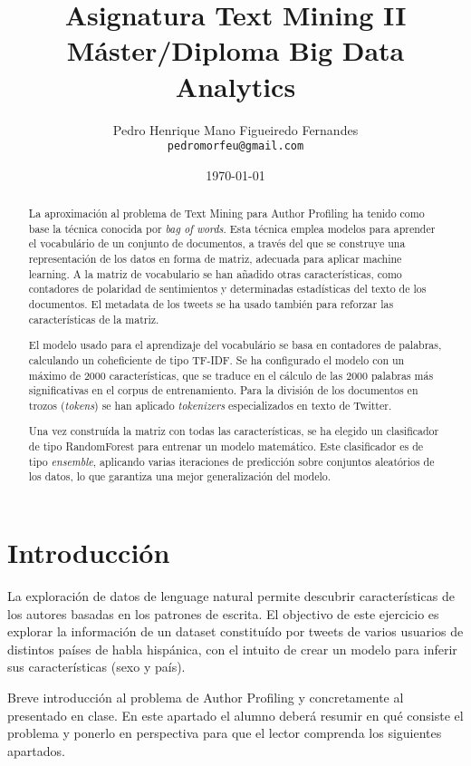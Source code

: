 \documentclass[11pt,a4paper]{article}
\title{Asignatura Text Mining II\\
M\'aster/Diploma Big Data Analytics}
\author{Pedro Henrique Mano Figueiredo Fernandes \\
  {\tt pedromorfeu@gmail.com} \\}
\date{\today}
\begin{document}
\maketitle
\begin{abstract}
  
  La aproximaci\'on al problema de Text Mining para Author Profiling ha tenido como base la t\'ecnica conocida por {\em bag of words}. Esta t\'ecnica emplea modelos para aprender el vocabul\'ario de un conjunto de documentos, a trav\'es del que se construye una representaci\'on de los datos en forma de matriz, adecuada para aplicar machine learning. A la matriz de vocabulario se han a\~nadido otras caracter\'isticas, como contadores de polaridad de sentimientos y determinadas estad\'isticas del texto de los documentos. El metadata de los tweets se ha usado también para reforzar las caracter\'isticas de la matriz.
  
  El modelo usado para el aprendizaje del vocabul\'ario se basa en contadores de palabras, calculando un coheficiente de tipo TF-IDF. Se ha configurado el modelo con un máximo de 2000 caracter\'isticas, que se traduce en el c\'alculo de las 2000 palabras más significativas en el corpus de entrenamiento. Para la divisi\'on de los documentos en trozos ({\em tokens}) se han aplicado {\em tokenizers} especializados en texto de Twitter.
  
  Una vez constru\'ida la matriz con todas las caracter\'isticas, se ha elegido un clasificador de tipo RandomForest para entrenar un modelo matem\'atico. Este clasificador es de tipo {\em ensemble}, aplicando varias iteraciones de predicci\'on sobre conjuntos aleat\'orios de los datos, lo que garantiza una mejor generalizaci\'on del modelo.

\end{abstract}


\section{Introducci\'on}

  La exploraci\'on de datos de lenguage natural permite descubrir características de los autores basadas en los patrones de escrita. El objectivo de este ejercicio es explorar la informaci\'on de un dataset constitu\'ido por tweets de varios usuarios de distintos pa\'ises de habla hisp\'anica, con el intuito de crear un modelo para inferir sus características (sexo y pa\'is).
  
   

  Breve introducci\'on al problema de Author Profiling y concretamente al presentado en clase. En este apartado el alumno deber\'a resumir en qu\'e consiste el problema y ponerlo en perspectiva para que el lector comprenda los siguientes apartados.
\end{document}
